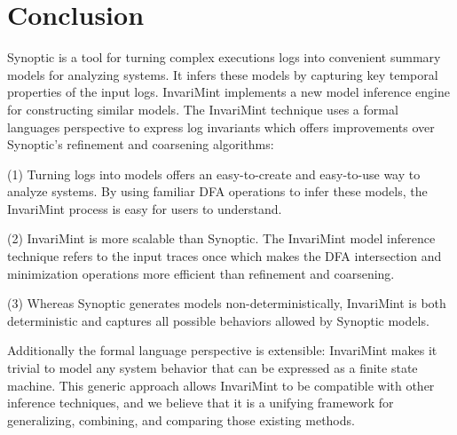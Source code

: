 \section{Conclusion}
\label{sec:conclusion}

Synoptic is a tool for turning complex executions logs into convenient summary models
for analyzing systems. It infers these models by capturing key temporal
properties of the input logs. InvariMint
implements a new model inference engine for constructing similar models. The
InvariMint technique uses a formal languages perspective to express log
invariants which offers improvements over Synoptic's refinement and coarsening
algorithms:

(1) Turning logs into models offers an easy-to-create and easy-to-use
way to analyze systems. By using familiar DFA operations to infer these models,
the InvariMint process is easy for users to understand.

(2) InvariMint is more scalable than Synoptic. The InvariMint model inference technique
refers to the input traces once which makes the DFA intersection and minimization
operations more efficient than refinement and coarsening.

(3) Whereas Synoptic generates models non-deterministically, InvariMint is both
deterministic and captures all possible behaviors allowed by Synoptic models.

Additionally the formal language perspective is extensible: InvariMint makes it trivial to model
any system behavior that can be expressed as a finite state machine. This
generic approach allows InvariMint to be compatible with other inference
techniques, and we believe that it is a unifying framework for generalizing,
combining, and comparing those existing methods.
